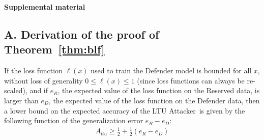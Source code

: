 \documentclass[letterpaper]{article}
\newcommand{\oracle}{LTU Attacker~}
\begin{document}
\clearpage








\appendix

\begin{center}
{\Large \bf Supplemental material}
\end{center}

\subsection{A. Derivation of the proof of Theorem~\ref{thm:blf}}

If the loss function $\ell(x)$ used to train the Defender model is bounded for all $x$, without loss of generality $0 \le \ell(x) \le 1$ (since loss functions can always be re-scaled), and if $e_R$, the expected value of the loss function on the Reserved data, is larger than $e_D$, the expected value of the loss function on the Defender data, then a lower bound on the expected accuracy of the \oracle is given by the following function of the generalization error $e^{}_R - e^{}_D$:
\begin{align}
A_{ltu} \ge \frac{1}{2} + \frac{1}{2} (e^{}_R - e^{}_D)
\end{align}
\end{document}
